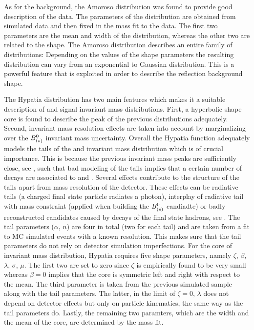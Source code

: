 As for the \LbJpsippi background, the Amoroso distribution was found to provide  good description of the data.
The parameters of the distribution are obtained from simulated data and then fixed in the mass fit to the data. The first two parameters
are the mean and width of the distribution, whereas the other two are related to the shape. The Amoroso distribution describes
an entire family of distributions: Depending on the values of the shape parameters the resulting distribution can vary from an exponential
to Gaussian distribution. This is a powerful feature that is exploited in order to describe the \LbJpsippi reflection background shape.

The Hypatia distribution has two main features which makes it a suitable description of \Bs and \Bd signal invariant mass distributions.
First, a hyperbolic shape core is found to describe the peak of the previous distributions adequately. Second, invariant mass resolution 
effects are taken into account by marginalizing over the $B^0_{(s)}$ invariant mass uncertainty. Overall the Hypatia function adequately
models the tails of the \Bs and \Bd invariant mass distribution which is of crucial importance. This is because the previous invariant
mass peaks are sufficiently close, see , such that bad modeling of the tails implies that a certain number of \Bd decays
are associated to \Bs and \viceversa. Several effects contribute to the structure of the tails apart
from mass resolution of the detector. These effects can be radiative tails (a charged final state particle radiates a photon), interplay of
radiative tail with \jpsi mass constraint (applied when building the $B^0_{(s)}$ candiadte) or badly reconstructed candidates caused by decays of the final state hadrons, see \cite{Santos:2013gra}.
The tail parameters ($\alpha$, $n$) are four in total (two for each tail) and are taken from a fit to MC simulated events with a known resolution.
This makes sure that the tail parameters do not rely on detector simulation imperfections.
For the core of invariant mass distribution, Hypatia requires five shape parameters, namely $\zeta$, $\beta$, $\lambda$, $\sigma$, $\mu$.
The first two are set to zero since $\zeta$ is empirically found to be very small whereas $\beta = 0$ implies that the core is 
symmetric left and right with respect to the mean. The third parameter is taken from the previous simulated sample along 
with the tail parameters. The latter, in the limit of $\zeta = 0$, $\lambda$ does not depend on detector effects but only 
on particle kinematics, the same way as the tail parameters do. Lastly, the remaining two paramters, which are the width and 
the mean of the core, are determined by the mass fit.


